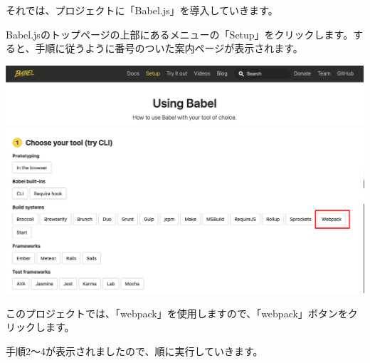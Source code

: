 それでは、プロジェクトに「Babel.js」を導入していきます。

\vspace*{\baselineskip}

Babel.jsのトップページの上部にあるメニューの「Setup」をクリックします。すると、手順に従うように番号のついた案内ページが表示されます。

\begin{reviewimage}%
\includegraphics[width=1.0\maxwidth]{./images/02-create-react-app/babel02.png}%
\label{image:02-create-react-app:babel02}
\end{reviewimage}

このプロジェクトでは、「webpack」を使用しますので、「webpack」ボタンをクリックします。

\vspace*{\baselineskip}

手順2〜4が表示されましたので、順に実行していきます。

